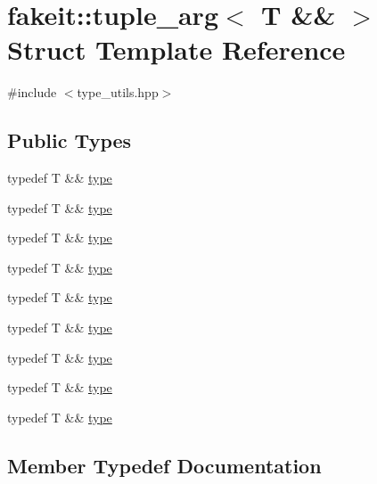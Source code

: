 \hypertarget{structfakeit_1_1tuple__arg_3_01T_01_6_6_01_4}{}\section{fakeit\+::tuple\+\_\+arg$<$ T \&\& $>$ Struct Template Reference}
\label{structfakeit_1_1tuple__arg_3_01T_01_6_6_01_4}


{\ttfamily \#include $<$type\+\_\+utils.\+hpp$>$}

\subsection*{Public Types}
\begin{DoxyCompactItemize}
\item 
typedef T \&\& \mbox{\hyperlink{structfakeit_1_1tuple__arg_3_01T_01_6_6_01_4_aaece97a3f54db78867b81f2d4c57d1a9}{type}}
\item 
typedef T \&\& \mbox{\hyperlink{structfakeit_1_1tuple__arg_3_01T_01_6_6_01_4_aaece97a3f54db78867b81f2d4c57d1a9}{type}}
\item 
typedef T \&\& \mbox{\hyperlink{structfakeit_1_1tuple__arg_3_01T_01_6_6_01_4_aaece97a3f54db78867b81f2d4c57d1a9}{type}}
\item 
typedef T \&\& \mbox{\hyperlink{structfakeit_1_1tuple__arg_3_01T_01_6_6_01_4_aaece97a3f54db78867b81f2d4c57d1a9}{type}}
\item 
typedef T \&\& \mbox{\hyperlink{structfakeit_1_1tuple__arg_3_01T_01_6_6_01_4_aaece97a3f54db78867b81f2d4c57d1a9}{type}}
\item 
typedef T \&\& \mbox{\hyperlink{structfakeit_1_1tuple__arg_3_01T_01_6_6_01_4_aaece97a3f54db78867b81f2d4c57d1a9}{type}}
\item 
typedef T \&\& \mbox{\hyperlink{structfakeit_1_1tuple__arg_3_01T_01_6_6_01_4_aaece97a3f54db78867b81f2d4c57d1a9}{type}}
\item 
typedef T \&\& \mbox{\hyperlink{structfakeit_1_1tuple__arg_3_01T_01_6_6_01_4_aaece97a3f54db78867b81f2d4c57d1a9}{type}}
\item 
typedef T \&\& \mbox{\hyperlink{structfakeit_1_1tuple__arg_3_01T_01_6_6_01_4_aaece97a3f54db78867b81f2d4c57d1a9}{type}}
\end{DoxyCompactItemize}


\subsection{Member Typedef Documentation}
\mbox{\label{structfakeit_1_1tuple__arg_3_01T_01_6_6_01_4_aaece97a3f54db78867b81f2d4c57d1a9}} 
